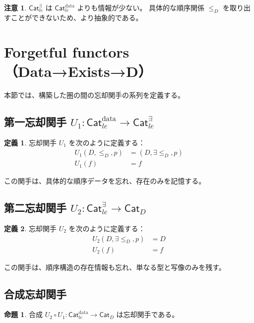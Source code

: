 \documentclass[a4paper,12pt]{ltjsarticle}
\theoremstyle{definition}
\newtheorem{definition}{定義}[section]
\newtheorem{proposition}{命題}[section]
\newtheorem{remark}{注意}[section]
\begin{document}
\begin{remark}
$\mathsf{Cat}_{le}^{\exists}$ は $\mathsf{Cat}_{le}^{\text{data}}$ よりも情報が少ない。
具体的な順序関係 $\le_D$ を取り出すことができないため、より抽象的である。
\end{remark}


\section{Forgetful functors（Data→Exists→D）}

本節では、構築した圏の間の忘却関手の系列を定義する。

\subsection{第一忘却関手 $U_1 : \mathsf{Cat}_{le}^{\text{data}} \to \mathsf{Cat}_{le}^{\exists}$}

\begin{definition}
忘却関手 $U_1$ を次のように定義する：
\begin{align*}
  U_1(D, \le_D, p) &= (D, \exists \le_D, p) \\
  U_1(f) &= f
\end{align*}
\end{definition}

この関手は、具体的な順序データを忘れ、存在のみを記憶する。

\subsection{第二忘却関手 $U_2 : \mathsf{Cat}_{le}^{\exists} \to \mathsf{Cat}_D$}

\begin{definition}
忘却関手 $U_2$ を次のように定義する：
\begin{align*}
  U_2(D, \exists \le_D, p) &= D \\
  U_2(f) &= f
\end{align*}
\end{definition}

この関手は、順序構造の存在情報も忘れ、単なる型と写像のみを残す。

\subsection{合成忘却関手}

\begin{proposition}
合成 $U_2 \circ U_1 : \mathsf{Cat}_{le}^{\text{data}} \to \mathsf{Cat}_D$ は忘却関手である。
\end{proposition}
\end{document}
